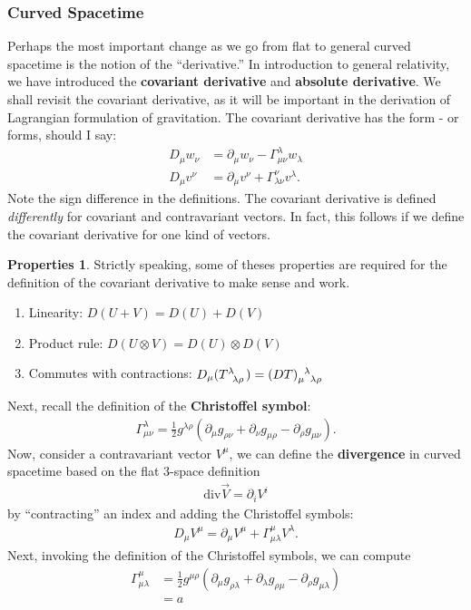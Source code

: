 \documentclass[a4paper,11pt]{article}
\numberwithin{equation}{section}
\theoremstyle{definition}
\newtheorem{propty}{Properties}[section]
\newcommand{\p}{\partial}
\begin{document}
\subsubsection{Curved Spacetime}
Perhaps the most important change as we go from flat to general curved spacetime is the notion of the ``derivative.'' In introduction to general relativity, we have introduced the \textbf{covariant derivative} and \textbf{absolute derivative}. We shall revisit the covariant derivative, as it will be important in the derivation of Lagrangian formulation of gravitation. The covariant derivative has the form - or forms, should I say:
\begin{align}
D_\mu w_\nu &= \p_\mu w_\nu - \Gamma^\lambda_{\mu\nu}w_\lambda\\
D_\mu v^\nu &= \p_\mu v^\nu + \Gamma^\nu_{\lambda\nu}v^\lambda.
\end{align}
Note the sign difference in the definitions. The covariant derivative is defined \textit{differently} for covariant and contravariant vectors. In fact, this follows if we define the covariant derivative for one kind of vectors.
\begin{propty}
	Strictly speaking, some of theses properties are required for the definition of the covariant derivative to make sense and work. 
	\begin{enumerate}
		\item Linearity: $D(U+V) = D(U) + D(V)$
		\item Product rule: $D(U\otimes V) = D(U)\otimes D(V)$
		\item Commutes with contractions: $D_\mu(\tensor{T}{^{\lambda}_{\lambda\rho}}) = \tensor{(DT)}{_\mu^\lambda_{\lambda\rho}}$
	\end{enumerate}
\end{propty} 
Next, recall the definition of the \textbf{Christoffel symbol}:
\begin{align}
\Gamma^{\lambda}_{\mu\nu} = \frac{1}{2}g^{\lambda\rho}\left(
   \p_{\mu}g_{\rho\nu}
 + \p_{\nu}g_{\mu\rho}
 - \p_{\rho}g_{\mu\nu}
 \right).
\end{align}
Now, consider a contravariant vector $V^\mu$, we can define the \textbf{divergence} in curved spacetime based on the flat 3-space definition
\begin{align}
\text{div}\vec{V} = \p_i V^i
\end{align}
by ``contracting'' an index and adding the Christoffel symbols:
\begin{align}
D_\mu V^\mu = \p_\mu V^\mu + \Gamma^\mu_{\mu\lambda}V^\lambda.
\end{align}
Next, invoking the definition of the Christoffel symbols, we can compute 
\begin{align}
\Gamma^\mu_{\mu\lambda} &= \frac{1}{2}g^{\mu\rho}(\p_\mu g_{\rho\lambda} + \p_\lambda g_{\rho\mu} - \p_\rho g_{\mu\lambda})\\
&= a
\end{align}
\end{document}
